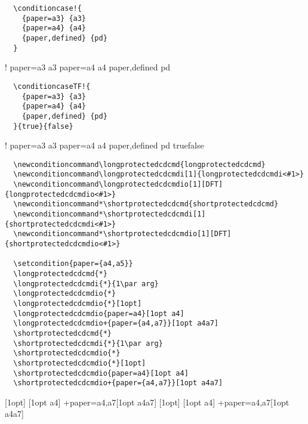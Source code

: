 {\color{red!90!black}
\begin{verbatim}
  \conditioncase!{
    {paper=a3} {a3}
    {paper=a4} {a4}
    {paper,defined} {pd}
  }
\end{verbatim}
}
\conditioncase!{
  {paper=a3} {a3}
  {paper=a4} {a4}
  {paper,defined} {pd}
}

{\color{red!90!black}
\begin{verbatim}
  \conditioncaseTF!{
    {paper=a3} {a3}
    {paper=a4} {a4}
    {paper,defined} {pd}
  }{true}{false}
\end{verbatim}
}
\conditioncaseTF!{
  {paper=a3} {a3}
  {paper=a4} {a4}
  {paper,defined} {pd}
}{true}{false}

{\color{red!90!black}
\begin{verbatim}
  \newconditioncommand\longprotectedcdcmd{longprotectedcdcmd}
  \newconditioncommand\longprotectedcdcmdi[1]{longprotectedcdcmdi<#1>}
  \newconditioncommand\longprotectedcdcmdio[1][DFT]{longprotectedcdcmdio<#1>}
  \newconditioncommand*\shortprotectedcdcmd{shortprotectedcdcmd}
  \newconditioncommand*\shortprotectedcdcmdi[1]{shortprotectedcdcmdi<#1>}
  \newconditioncommand*\shortprotectedcdcmdio[1][DFT]{shortprotectedcdcmdio<#1>}

  \setcondition{paper={a4,a5}}
  \longprotectedcdcmd{*}
  \longprotectedcdcmdi{*}{1\par arg}
  \longprotectedcdcmdio{*}
  \longprotectedcdcmdio{*}[1opt]
  \longprotectedcdcmdio{paper=a4}[1opt a4]
  \longprotectedcdcmdio+{paper={a4,a7}}[1opt a4a7]
  \shortprotectedcdcmd{*}
  \shortprotectedcdcmdi{*}{1\par arg}
  \shortprotectedcdcmdio{*}
  \shortprotectedcdcmdio{*}[1opt]
  \shortprotectedcdcmdio{paper=a4}[1opt a4]
  \shortprotectedcdcmdio+{paper={a4,a7}}[1opt a4a7]
\end{verbatim}
}
\newconditioncommand{}
\newconditioncommand{}
\newconditioncommand{}
\newconditioncommand*{}
\newconditioncommand*{}
\newconditioncommand*{}

{\ttfamily{}\obeylines
\longprotectedcdcmd{*}
\longprotectedcdcmdio{*}
\longprotectedcdcmdio{*}[1opt]
[1opt a4]
\longprotectedcdcmdio+{paper={a4,a7}}[1opt a4a7]
\shortprotectedcdcmd{*}
\shortprotectedcdcmdio{*}
\shortprotectedcdcmdio{*}[1opt]
[1opt a4]
\shortprotectedcdcmdio+{paper={a4,a7}}[1opt a4a7]
}
